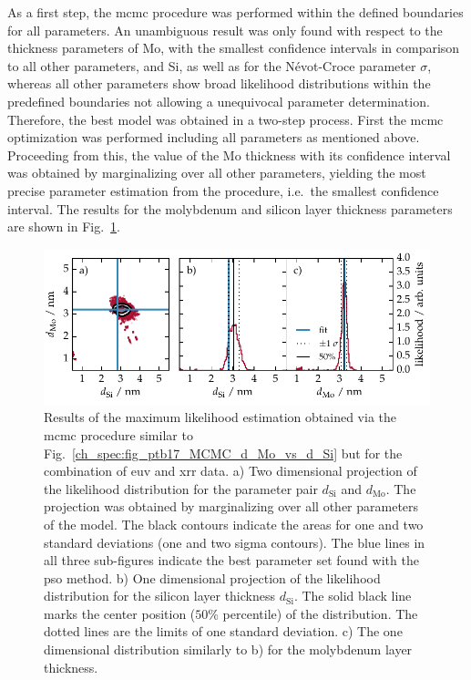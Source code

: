 As a first step, the \gls{mcmc} procedure was performed within the defined boundaries for all parameters. An unambiguous result was only found with respect to the thickness parameters of Mo, with the smallest confidence intervals in comparison to all other parameters, and Si, as well as for the N\'{e}vot-Croce parameter $\sigma$, whereas all other parameters show broad likelihood distributions within the predefined boundaries not allowing a unequivocal parameter determination. Therefore, the best model was obtained in a two-step process. First the \gls{mcmc} optimization was performed including all parameters as mentioned above. Proceeding from this, the value of the Mo thickness with its confidence interval was obtained by marginalizing over all other parameters, yielding the most precise parameter estimation from the procedure, i.e.~the smallest confidence interval. The results for the molybdenum and silicon layer thickness parameters are shown in Fig.~\ref{ch_spec:fig_Mo_Si_C_d_Mo_vs_d_Si}.
\begin{figure}[htbp]
\centering
\includegraphics{img/Mo_Si_C_d_Mo_vs_d_Si}
\caption{Results of the maximum likelihood estimation obtained via the \gls{mcmc} procedure similar to Fig.~\ref{ch_spec:fig_ptb17_MCMC_d_Mo_vs_d_Si} but for the combination of \gls{euv} and \gls{xrr} data. a) Two dimensional projection of the likelihood distribution for the parameter pair $d_\text{Si}$ and $d_\text{Mo}$. The projection was obtained by marginalizing over all other parameters of the model. The black contours indicate the areas for one and two standard deviations (one and two sigma contours). The blue lines in all three sub-figures indicate the best parameter set found with the \gls{pso} method. b) One dimensional projection of the likelihood distribution for the silicon layer thickness $d_\text{Si}$. The solid black line marks the center position ($50\%$ percentile) of the distribution. The dotted lines are the limits of one standard deviation. c) The one dimensional distribution similarly to b) for the molybdenum layer thickness.}
\label{ch_spec:fig_Mo_Si_C_d_Mo_vs_d_Si}
\end{figure}
